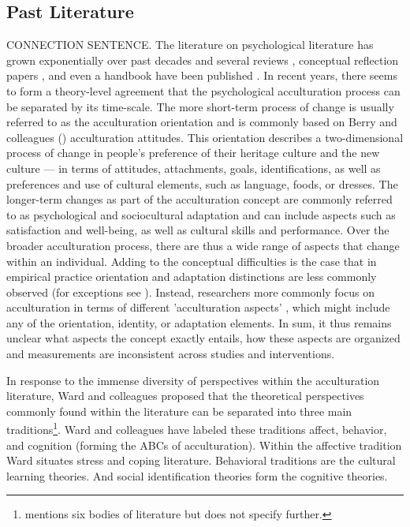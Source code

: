 \documentclass[nobib]{tufte-handout}
\begin{document}
\subsection{Past Literature}
CONNECTION SENTENCE.
The literature on psychological literature has grown exponentially over past decades \citet{Rudmin2003a} and several reviews \citep[e.g.,][]{DeLeersnyder2017, Matsudaira2006, Celenk2011}, conceptual reflection papers \citep[e.g.,][]{Ward2012, Berry1997b}, and even a handbook have been published \citep{Sam2006a}. 
In recent years, there seems to form a theory-level agreement that the psychological acculturation process can be separated by its time-scale. The more short-term process of change is usually referred to as the acculturation orientation \citep[e.g.,][]{Ward2001, Berry2003} and is commonly based on Berry and colleagues (\citeyear{Berry1997b, Berry2003}) acculturation attitudes. This orientation describes a two-dimensional process of change in people’s preference of their heritage culture and the new culture --- in terms of attitudes, attachments, goals, identifications, as well as preferences and use of cultural elements, such as language, foods, or dresses.
The longer-term changes as part of the acculturation concept are commonly referred to as psychological and sociocultural adaptation \citep{Searle1990, Ward2001, Berry2003} and can include aspects such as satisfaction and well-being, as well as cultural skills and performance. Over the broader acculturation process, there are thus a wide range of aspects that change within an individual. Adding to the conceptual difficulties is the case that in empirical practice orientation and adaptation distinctions are less commonly observed (for exceptions see \citealp{ICSEYteam2006, Berry2006b, TeLindert2008a}). Instead, researchers more commonly focus on acculturation in terms of different 'acculturation aspects' \citep{Arends-Toth2006a}, which might include any of the orientation, identity, or adaptation elements. In sum, it thus remains unclear what aspects the concept exactly entails, how these aspects are organized and measurements are inconsistent across studies and interventions.

In response to the immense diversity of perspectives within the acculturation literature, Ward and colleagues \citep{Ward2001, Masgoret2006, Ward2019} proposed that the theoretical perspectives commonly found within the literature can be separated into three main traditions\footnote{\citet{Ward2001} mentions six bodies of literature but does not specify further.}. Ward and colleagues have labeled these traditions affect, behavior, and cognition (forming the ABCs of acculturation). Within the affective tradition Ward situates stress and coping literature. Behavioral traditions are the cultural learning theories. And social identification theories form the cognitive theories.
\end{document}
